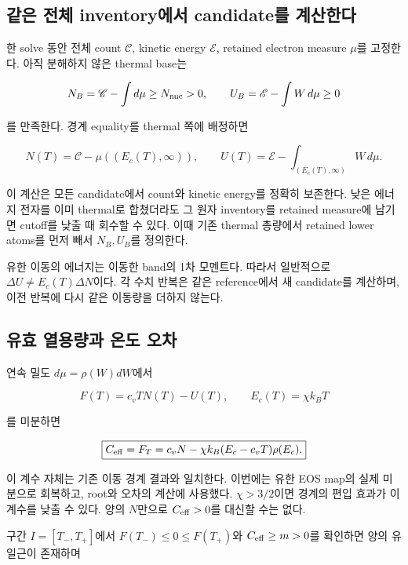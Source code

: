 \hypertarget{uxac19uxc740-uxc804uxccb4-inventoryuxc5d0uxc11c-candidateuxb97c-uxacc4uxc0b0uxd55cuxb2e4}{%
\subsection{같은 전체 inventory에서 candidate를 계산한다}\label{uxac19uxc740-uxc804uxccb4-inventoryuxc5d0uxc11c-candidateuxb97c-uxacc4uxc0b0uxd55cuxb2e4}}

한 solve 동안 전체 count \(\mathscr C\), kinetic energy \(\mathscr E\), retained electron measure \(\mu\)를 고정한다. 아직 분해하지 않은 thermal base는

\[
N_B=\mathscr C-\int d\mu\ge N_{\rm nuc}>0,\qquad
U_B=\mathscr E-\int W\,d\mu\ge0
\]

를 만족한다. 경계 equality를 thermal 쪽에 배정하면

\[
\boxed{N(T)=\mathscr C-\mu((E_c(T),\infty)),\qquad
U(T)=\mathscr E-\int_{(E_c(T),\infty)}W\,d\mu.}
\]

이 계산은 모든 candidate에서 count와 kinetic energy를 정확히 보존한다. 낮은 에너지 전자를 이미 thermal로 합쳤더라도 그 원자 inventory를 retained measure에 남기면 cutoff를 낮출 때 회수할 수 있다. 이때 기존 thermal 총량에서 retained lower atoms를 먼저 빼서 \(N_B,U_B\)를 정의한다.

유한 이동의 에너지는 이동한 band의 1차 모멘트다. 따라서 일반적으로 \(\Delta U\ne E_c(T)\Delta N\)이다. 각 수치 반복은 같은 reference에서 새 candidate를 계산하며, 이전 반복에 다시 같은 이동량을 더하지 않는다.

\hypertarget{uxc720uxd6a8-uxc5f4uxc6a9uxb7c9uxacfc-uxc628uxb3c4-uxc624uxcc28}{%
\subsection{유효 열용량과 온도 오차}\label{uxc720uxd6a8-uxc5f4uxc6a9uxb7c9uxacfc-uxc628uxb3c4-uxc624uxcc28}}

연속 밀도 \(d\mu=\rho(W)dW\)에서

\[
F(T)=c_vTN(T)-U(T),\qquad E_c(T)=\chi k_BT
\]

를 미분하면

\[
\boxed{C_{\rm eff}=F_T=c_vN-\chi k_B(E_c-c_vT)\rho(E_c).}
\]

이 계수 자체는 기존 이동 경계 결과와 일치한다. 이번에는 유한 EOS map의 실제 미분으로 회복하고, root와 오차의 계산에 사용했다. \(\chi>3/2\)이면 경계의 편입 효과가 이 계수를 낮출 수 있다. 양의 \(N\)만으로 \(C_{\rm eff}>0\)를 대신할 수는 없다.

구간 \(I=[T_-,T_+]\)에서 \(F(T_-)\le0\le F(T_+)\)와 \(C_{\rm eff}\ge m>0\)를 확인하면 양의 유일근이 존재하며


